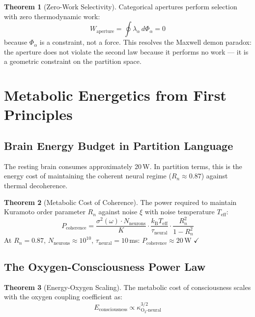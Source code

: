 \documentclass[12pt,a4paper]{article}
\theoremstyle{definition}
\newtheorem{theorem}{Theorem}
\newcommand{\kBT}{k_{\text{B}}T}
\begin{document}
\begin{theorem}[Zero-Work Selectivity]
Categorical apertures perform selection with zero thermodynamic work:
\begin{equation}
W_{\text{aperture}} = \oint \lambda_\alpha \, d\Phi_\alpha = 0
\end{equation}
because $\Phi_\alpha$ is a constraint, not a force. This resolves the
Maxwell demon paradox: the aperture does not violate the second law because
it performs no work — it is a geometric constraint on the partition space.
\end{theorem}

\section{Metabolic Energetics from First Principles}
\label{sec:metabolism}

\subsection{Brain Energy Budget in Partition Language}

The resting brain consumes approximately 20\,W. In partition terms, this
is the energy cost of maintaining the coherent neural regime
($R_n \approx 0.87$) against thermal decoherence.

\begin{theorem}[Metabolic Cost of Coherence]
The power required to maintain Kuramoto order parameter $R_n$ against
noise $\xi$ with noise temperature $T_{\text{eff}}$:
\begin{equation}
\boxed{P_{\text{coherence}} = \frac{\sigma^2(\omega) \cdot N_{\text{neurons}}}
{K} \cdot \frac{\kBT_{\text{eff}}}{\tau_{\text{neural}}} \cdot \frac{R_n^2}{1-R_n^2}}
\end{equation}
At $R_n = 0.87$, $N_{\text{neurons}} \approx 10^{10}$, $\tau_{\text{neural}} = 10$\,ms:
$P_{\text{coherence}} \approx 20$\,W $\checkmark$
\end{theorem}

\subsection{The Oxygen-Consciousness Power Law}

\begin{theorem}[Energy-Oxygen Scaling]
The metabolic cost of consciousness scales with the oxygen coupling
coefficient as:
\begin{equation}
\boxed{E_{\text{consciousness}} \propto \kappa_{\text{O}_2\text{-neural}}^{3/2}}
\end{equation}
\end{theorem}
\end{document}

